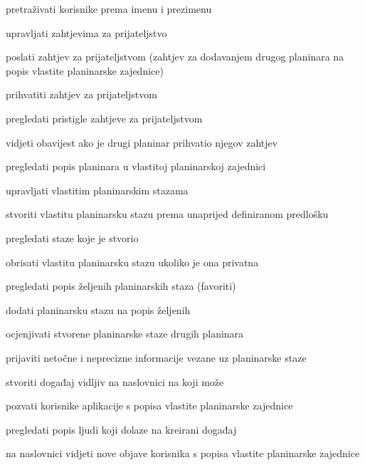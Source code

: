 \begin{packed_enum}
\begin{packed_enum}
\begin{packed_enum}
						\end{packed_enum}
					\item pretraživati korisnike prema imenu i prezimenu
					\item upravljati zahtjevima za prijateljstvo
					
						\begin{packed_enum}
							\item poslati zahtjev za prijateljstvom (zahtjev za dodavanjem drugog planinara na popis vlastite planinarske zajednice)
							\item prihvatiti zahtjev za prijateljstvom
							\item pregledati pristigle zahtjeve za prijateljstvom
							\item vidjeti obavijest ako je drugi planinar prihvatio njegov zahtjev
						\end{packed_enum}
					
					\item pregledati popis planinara u vlastitoj planinarskoj zajednici
					\item upravljati vlastitim planinarskim stazama
					\begin{packed_enum}
						\item stvoriti vlastitu planinarsku stazu prema unaprijed definiranom predlošku
						\item pregledati staze koje je stvorio
						\item obrisati vlastitu planinarsku stazu ukoliko je ona privatna
					\end{packed_enum}
					\item pregledati popis željenih planinarskih staza (favoriti)
					\item dodati planinarsku stazu na popis željenih
					\item ocjenjivati stvorene planinarske staze drugih planinara
					\item prijaviti netočne i neprecizne informacije vezane uz planinarske staze
					\item stvoriti događaj vidljiv na naslovnici na koji može
						\begin{packed_enum}
							
							\item  pozvati korisnike aplikacije s popisa vlastite planinarske zajednice 
							\item  pregledati popis ljudi koji dolaze na kreirani događaj
							
						\end{packed_enum}
					\item na naslovnici vidjeti nove objave korisnika s popisa vlastite planinarske zajednice
						\begin{packed_enum}
					

\end{packed_enum}
\end{packed_enum}
\end{packed_enum}
